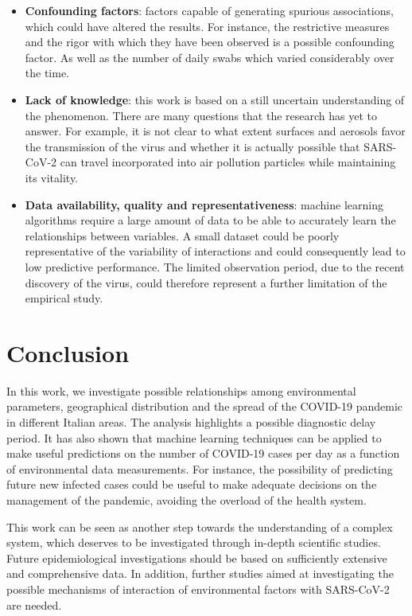 \documentclass[review]{elsarticle}
\begin{document}
\begin{itemize}
    \item \textbf{Confounding factors}:
factors capable of generating spurious associations, which could have altered the results. For instance, the restrictive measures and the rigor with which they have been observed is a possible confounding factor. As well as the number of daily swabs which varied considerably over the time.

    \item \textbf{Lack of knowledge}:  this work is based on a still uncertain understanding of the phenomenon. There are many questions that the research has yet to answer. For example, it is not clear to what extent surfaces and aerosols favor the transmission of the virus and whether it is actually possible that SARS-CoV-2 can travel incorporated into air pollution particles while maintaining its vitality.

    \item \textbf{Data availability, quality and representativeness}: machine learning algorithms require a large amount of data to be able to accurately learn the relationships between variables. A small dataset could be poorly representative of the variability of interactions and could consequently lead to low predictive performance. The limited observation period, due to the recent discovery of the virus, could therefore represent a further limitation of the empirical study.
\end{itemize}

\section{Conclusion}

In this work, we investigate possible relationships among environmental parameters, geographical distribution and the spread of the COVID-19 pandemic in different Italian areas. The analysis highlights a possible diagnostic delay period. It has also shown that machine learning techniques can be applied to make useful predictions on the number of COVID-19 cases per day as a function of environmental data measurements. For instance, the possibility of predicting future new infected cases could be useful to make adequate decisions on the management of the pandemic, avoiding the overload of the health system. 

This work can be seen as another step towards the understanding of a complex system, which deserves to be investigated through in-depth scientific studies. Future epidemiological investigations should be based on sufficiently extensive and comprehensive data. In addition, further studies aimed at investigating the possible mechanisms of interaction of environmental factors with SARS-CoV-2 are needed.
\end{document}
